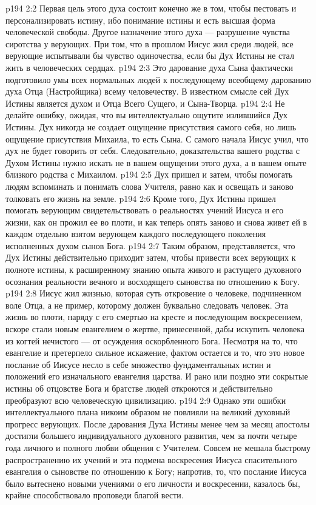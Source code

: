 \vs p194 2:2 \pc Первая цель этого духа состоит конечно же в том, чтобы пестовать и персонализировать истину, ибо понимание истины и есть высшая форма человеческой свободы. Другое назначение этого духа --- разрушение чувства сиротства у верующих. При том, что в прошлом Иисус жил среди людей, все верующие испытывали бы чувство одиночества, если бы Дух Истины не стал жить в человеческих сердцах.
\vs p194 2:3 Это дарование духа Сына фактически подготовило умы всех нормальных людей к последующему всеобщему дарованию духа Отца (Настройщика) всему человечеству. В известном смысле сей Дух Истины является духом и Отца Всего Сущего, и Сына\hyp{}Творца.
\vs p194 2:4 Не делайте ошибку, ожидая, что вы интеллектуально ощутите излившийся Дух Истины. Дух никогда не создает ощущение присутствия самого себя, но лишь ощущение присутствия Михаила, то есть Сына. С самого начала Иисус учил, что дух не будет говорить от себя. Следовательно, доказательства вашего родства с Духом Истины нужно искать не в вашем ощущении этого духа, а в вашем опыте близкого родства с Михаилом.
\vs p194 2:5 Дух пришел и затем, чтобы помогать людям вспоминать и понимать слова Учителя, равно как и освещать и заново толковать его жизнь на земле.
\vs p194 2:6 Кроме того, Дух Истины пришел помогать верующим свидетельствовать о реальностях учений Иисуса и его жизни, как он прожил ее во плоти, и как теперь опять заново и снова живет ей в каждом отдельно взятом верующем каждого последующего поколения исполненных духом сынов Бога.
\vs p194 2:7 Таким образом, представляется, что Дух Истины действительно приходит затем, чтобы привести всех верующих к полноте истины, к расширенному знанию опыта живого и растущего духовного осознания реальности вечного и восходящего сыновства по отношению к Богу.
\vs p194 2:8 \pc Иисус жил жизнью, которая суть откровение о человеке, подчиненном воле Отца, а не пример, которому должен буквально следовать человек. Эта жизнь во плоти, наряду с его смертью на кресте и последующим воскресением, вскоре стали новым евангелием о жертве, принесенной, дабы искупить человека из когтей нечистого --- от осуждения оскорбленного Бога. Несмотря на то, что евангелие и претерпело сильное искажение, фактом остается и то, что это новое послание об Иисусе несло в себе множество фундаментальных истин и положений его изначального евангелия царства. И рано или поздно эти сокрытые истины об отцовстве Бога и братстве людей откроются и действительно преобразуют всю человеческую цивилизацию.
\vs p194 2:9 Однако эти ошибки интеллектуального плана никоим образом не повлияли на великий духовный прогресс верующих. После дарования Духа Истины менее чем за месяц апостолы достигли большего индивидуального духовного развития, чем за почти четыре года личного и полного любви общения с Учителем. Совсем не мешала быстрому распространению их учений и эта подмена  воскресения Иисуса  спасительного евангелия о сыновстве по отношению к Богу; напротив, то, что послание Иисуса было вытеснено новыми учениями о его личности и воскресении, казалось бы, крайне способствовало проповеди благой вести.
